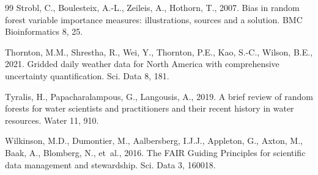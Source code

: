 \documentclass[preprint,12pt,authoryear]{elsarticle}
\begin{document}
\begin{thebibliography}{99}
Strobl, C., Boulesteix, A.-L., Zeileis, A., Hothorn, T., 2007. Bias in random forest variable importance measures: illustrations, sources and a solution. BMC Bioinformatics 8, 25.

Thornton, M.M., Shrestha, R., Wei, Y., Thornton, P.E., Kao, S.-C., Wilson, B.E., 2021. Gridded daily weather data for North America with comprehensive uncertainty quantification. Sci. Data 8, 181.

Tyralis, H., Papacharalampous, G., Langousis, A., 2019. A brief review of random forests for water scientists and practitioners and their recent history in water resources. Water 11, 910.

Wilkinson, M.D., Dumontier, M., Aalbersberg, I.J.J., Appleton, G., Axton, M., Baak, A., Blomberg, N., et~al., 2016. The FAIR Guiding Principles for scientific data management and stewardship. Sci. Data 3, 160018.

\end{thebibliography}
\end{document}
